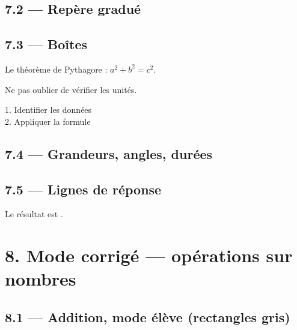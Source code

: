 \documentclass[12pt]{extarticle}
\begin{document}
\subsection*{7.2 — Repère gradué}

\reperegradue[bg={(-5,-5)}, hd={(5,5)},
              points={A/(4,5), B/(-2,3)/blue},
              affichernom=true, affichercoords=true]

\subsection*{7.3 — Boîtes}

\begin{retenir}
  Le théorème de Pythagore : $a^2 + b^2 = c^2$.
\end{retenir}

\begin{vigilance}
  Ne pas oublier de vérifier les unités.
\end{vigilance}

\begin{methode}
  1. Identifier les données \\
  2. Appliquer la formule
\end{methode}

\subsection*{7.4 — Grandeurs, angles, durées}

 \quad
{} \quad
{}

\subsection*{7.5 — Lignes de réponse}

Le résultat est \reponse. \grandeReponse[0.5]

\section*{8. Mode corrigé — opérations sur nombres}

\subsection*{8.1 — Addition, mode élève (rectangles gris)}
\end{document}
